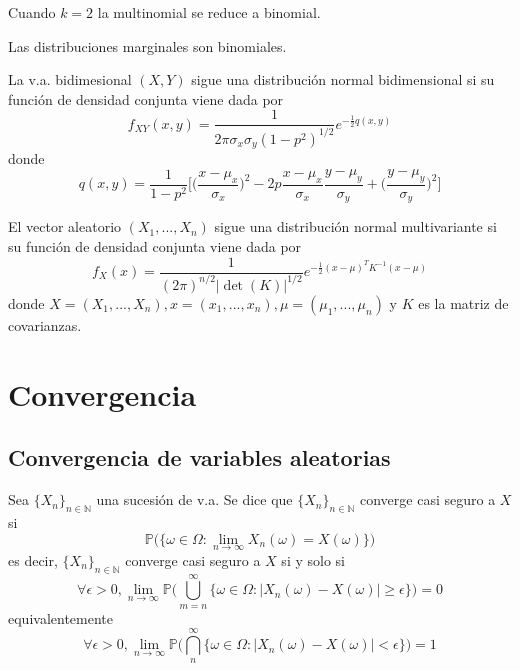 \begin{obs}
Cuando $k=2$ la multinomial se reduce a binomial.
\end{obs}

\begin{obs}
Las distribuciones marginales son binomiales.
\end{obs}

\begin{defn}
La v.a. bidimesional $(X,Y)$ sigue una distribución normal bidimensional si su función de densidad conjunta viene dada por \[ f_{XY}(x,y) = \frac{1}{2\pi\sigma_x\sigma_y(1-p^2)^{1/2}}e^{-\frac{1}{2}q(x,y)} \] donde \[ q(x,y) = \frac{1}{1-p^2}\bigg[\bigg(\frac{x - \mu_x}{\sigma_x}\bigg)^2 -2p\frac{x - \mu_x}{\sigma_x}\frac{y - \mu_y}{\sigma_y} + \bigg( \frac{y-\mu_y}{\sigma_y} \bigg)^2 \bigg]\]
\end{defn}

\begin{defn}
El vector aleatorio $(X_1,...,X_n)$ sigue una distribución normal multivariante si su función de densidad conjunta viene dada por \[ f_X(x) = \frac{1}{(2\pi)^{n/2}|\det(K)|^{1/2}}e^{-\frac{1}{2}(x-\mu)^TK^{-1}(x-\mu)}\] donde $X= (X_1,...,X_n), x = (x_1,...,x_n), \mu = (\mu_1,...,\mu_n)$ y $K$ es la matriz de covarianzas.
\end{defn}

\chapter{Convergencia}
\section{Convergencia de variables aleatorias}

\begin{defn}
Sea $\{ X_n\}_{n\in\mathbb{N}}$ una sucesión de v.a. Se dice que $\{ X_n\}_{n\in\mathbb{N}}$ converge casi seguro a $X$ si \[ \mathbb{P} \bigg( \{ \omega\in\Omega: \lim_{n\rightarrow\infty} X_n(\omega) = X(\omega) \} \bigg)\] es decir, $\{ X_n\}_{n\in\mathbb{N}}$ converge casi seguro a $X$ si y solo si \[ \forall\epsilon>0, \lim_{n\rightarrow\infty} \mathbb{P}\bigg(\bigcup_{m=n}^\infty \{ \omega\in\Omega:|X_n(\omega) -X(\omega)| \geq \epsilon \} \bigg)=0 \] equivalentemente  \[ \forall\epsilon>0, \lim_{n\rightarrow\infty} \mathbb{P}\bigg(\bigcap_{n}^\infty \{ \omega\in\Omega:|X_n(\omega) -X(\omega)| < \epsilon \} \bigg)=1 \]
\end{defn}


